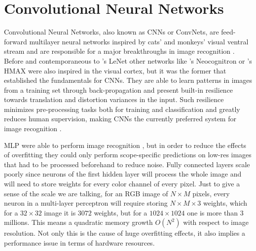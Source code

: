 
\section{Convolutional Neural Networks}
\label{sec:theory:convnets}
Convolutional Neural Networks, also known as CNNs or ConvNets, are feed-forward multilayer neural networks inspired by cats' and monkeys' visual ventral stream \cite{Hubel1968,Lawrence1997} and are responsible for a major breakthroughs in image recognition \cite{LeCun1995}.
Before and contemporaneous to \citeauthor{LeCun1998}'s LeNet \cite{LeCun1998} other networks like \citeauthor{Fukushima1980}'s Neocognitron \cite{Fukushima1980} or \citeauthor{Riesenhuber1999}'s HMAX \cite{Riesenhuber1999} were also inspired in the visual cortex, but it was the former that established the fundamentals for CNNs.
They are able to learn patterns in images from a training set through back-propagation and present built-in resilience towards translation and distortion variances in the input.
Such resilience minimizes pre-processing tasks both for training and classification and greatly reduces human supervision, making CNNs the currently preferred system for image recognition \cite{Visin2015}.

MLP were able to perform image recognition \cite{ZHANG1999}, but in order to reduce the effects of overfitting they could only perform scope-specific predictions on low-res images that had to be processed beforehand to reduce noise.
Fully connected layers scale poorly since neurons of the first hidden layer will process the whole image and will need to store weights for every color channel of every pixel.
Just to give a sense of the scale we are talking, for an RGB image of ${N}\times{M}$ pixels, every neuron in a multi-layer perceptron will require storing ${N}\times{M}\times{3}$ weights, which for a ${32}\times{32}$ image it is $3072$ weights, but for a ${1024}\times{1024}$ one is more than $3$ millions.
This means a quadratic memory growth $O(N^2)$ with respect to image resolution.
Not only this is the cause of huge overfitting effects, it also implies a performance issue in terms of hardware resources.


